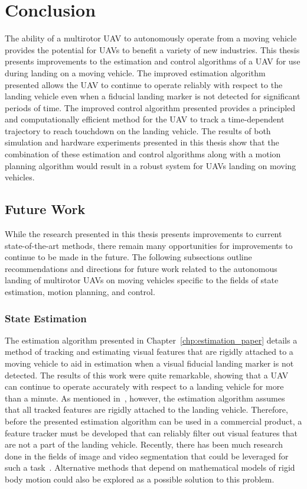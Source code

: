 
\chapter{Conclusion}
\label{chp:conclusion}

The ability of a multirotor UAV to autonomously operate from a moving vehicle
provides the potential for UAVs to benefit a variety of new industries. This
thesis presents improvements to the estimation and control algorithms of a UAV
for use during landing on a moving vehicle. The improved estimation algorithm presented
allows the UAV to continue to operate reliably with respect to the landing vehicle
even when a fiducial landing marker is not detected for significant
periods of time. The improved control algorithm presented provides a principled
and computationally efficient method for the UAV to track a time-dependent
trajectory to reach touchdown on the landing vehicle. The results of both simulation and hardware
experiments presented in this thesis show that the combination of these estimation and control
algorithms along with a motion planning algorithm would result in a robust
system for UAVs landing on moving vehicles.

\section{Future Work}
\label{sec:future_work}
While the research presented in this thesis presents improvements to current
state-of-the-art methods, there remain many opportunities for improvements to
continue to be made in the future. The following subsections outline
recommendations and directions for future work related to the autonomous
landing of multirotor UAVs on moving vehicles specific to the fields of state
estimation, motion planning, and control.

\subsection{State Estimation}
The estimation algorithm presented in Chapter~\ref{chp:estimation_paper} details
a method of tracking and estimating visual features that are rigidly attached to
a moving vehicle to aid in estimation when a visual fiducial landing marker is
not detected. The results of this work were quite remarkable, showing that a UAV
can continue to operate accurately with respect to a landing vehicle for more
than a minute. As mentioned in~, however, the estimation algorithm
assumes that all tracked features are rigidly attached to the landing vehicle.
Therefore, before the presented estimation algorithm can be used in a commercial
product, a feature tracker must be developed that can reliably filter out visual
features that are not a part of the landing vehicle.
Recently, there has been much research done
in the fields of image and video segmentation that could be leveraged for such a
task~\cite{chen2018encoder}. Alternative methods that depend on
mathematical models of rigid body motion could also be explored as a possible
solution to this problem.

